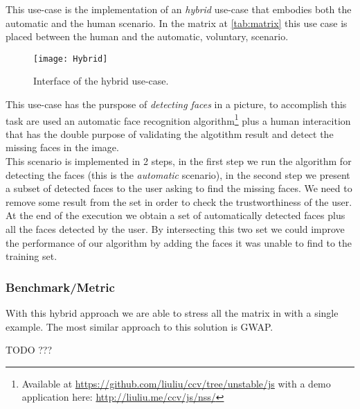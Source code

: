 This use-case is the implementation of an \emph{hybrid} use-case that embodies
both the automatic and the human scenario. In the matrix at \autoref{tab:matrix}
this use case is placed between the human and the automatic, voluntary, scenario.

\begin{figure}[htb]
    \centering
    \texttt{[image: Hybrid]}
    \caption{Interface of the hybrid use-case.}
    \label{fig:Hybrid1}
\end{figure}

This use-case has the purspose of \emph{detecting faces} in a picture, to
accomplish this task are used an automatic face recognition algorithm\footnote{
Available at \url{https://github.com/liuliu/ccv/tree/unstable/js} with a demo
application here: \url{http://liuliu.me/ccv/js/nss/}} plus a human interacition
that has the double purpose of validating the algotithm result and detect the
missing faces in the image.\\

This scenario is implemented in 2 steps, in the first step we run the algorithm
for detecting the faces (this is the \emph{automatic} scenario), in the second
step we present a subset of detected faces to the user asking to find the
missing faces. We need to remove some result from the set in order to check the
trustworthiness of the user.\\

At the end of the execution we obtain a set of automatically detected faces plus
all the faces detected by the user. By intersecting this two set we could improve
the performance of our algorithm by adding the faces it was unable to find to
the training set.

\subsubsection{Benchmark/Metric}
With this hybrid approach we are able to stress all the matrix in with a single
example. The most similar approach to this solution is \ac{GWAP}.

TODO ???